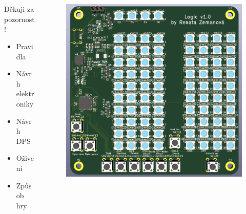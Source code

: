 \documentclass[%
  12pt,       				%
	t,                  %
	aspectratio=1610,   %
	unicode,						%
]{beamer}				    	%
\begin{document}
\begin{frame} 
	\frametitle{\mbox{ }}
	\begin{columns}[T] %
		\begin{column}{0.3\textwidth}		%
			\vspace{0.7cm}
			\centering
			{\Huge Děkuji za pozornost!}
			\vspace{0.7cm}
			\begin{itemize}
				\item Pravidla
				\item Návrh elektroniky
				\item Návrh DPS
				\item Oživení
				\item Způsob hry
			\end{itemize}
		\end{column}
		\begin{column}{0.7\textwidth}		%
			\begin{figure}%
				\centering
				\includegraphics[width=0.6\columnwidth]{obrazky/Verze1_3D_pohled.png}
			\end{figure}
		\end{column}
	\end{columns}	
\end{frame}
\end{document}
